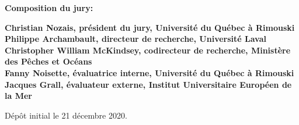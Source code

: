 \thispagestyle{empty}

\null
\vfill
\noindent \textbf{Composition du jury:}\\
\vspace{1cm}

\begin{singlespace}
  \noindent \textbf{Christian Nozais, président du jury, Université du Québec à Rimouski}\\

  \noindent \textbf{Philippe Archambault, directeur de recherche, Université Laval}\\

  \noindent \textbf{Christopher William McKindsey, codirecteur de recherche, Ministère des Pêches et Océans}\\

  \noindent \textbf{Fanny Noisette, évaluatrice interne, Université du Québec à Rimouski}\\

  \noindent \textbf{Jacques Grall, évaluateur externe, Institut Universitaire Européen de la Mer}\\
\end{singlespace}

\vspace{2cm}
\noindent Dépôt initial le 21 décembre 2020.
\hspace{3cm}


\cleardoublepage
